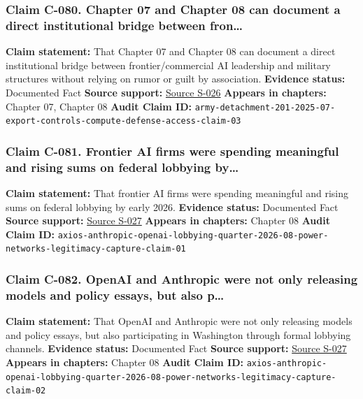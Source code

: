 \documentclass[
  american,
  11pt,
  letterpaper,
]{article}
\begin{document}
\subsubsection{Claim C-080. Chapter 07 and Chapter 08 can document a
direct institutional bridge between
fron\ldots{}}\label{claim-c-080-chapter-07-and-chapter-08-can-document-a-direct-institutional-bridge-between-fron}

\textbf{Claim statement:} That Chapter 07 and Chapter 08 can document a
direct institutional bridge between frontier/commercial AI leadership
and military structures without relying on rumor or guilt by
association. \textbf{Evidence status:} Documented Fact \textbf{Source
support:}
\hyperref[source-s-026-army-launches-detachment-201-executive-innovation-corps-to-drive-tech-transformation]{Source
S-026} \textbf{Appears in chapters:} Chapter 07, Chapter 08
\textbf{Audit Claim ID:}
\texttt{army-detachment-201-2025-07-export-controls-compute-defense-access-claim-03}

\subsubsection{Claim C-081. Frontier AI firms were spending meaningful
and rising sums on federal lobbying
by\ldots{}}\label{claim-c-081-frontier-ai-firms-were-spending-meaningful-and-rising-sums-on-federal-lobbying-by}

\textbf{Claim statement:} That frontier AI firms were spending
meaningful and rising sums on federal lobbying by early 2026.
\textbf{Evidence status:} Documented Fact \textbf{Source support:}
\hyperref[source-s-027-anthropic-outspends-openai-in-biggest-ever-lobbying-quarter]{Source
S-027} \textbf{Appears in chapters:} Chapter 08 \textbf{Audit Claim ID:}
\texttt{axios-anthropic-openai-lobbying-quarter-2026-08-power-networks-legitimacy-capture-claim-01}

\subsubsection{Claim C-082. OpenAI and Anthropic were not only releasing
models and policy essays, but also
p\ldots{}}\label{claim-c-082-openai-and-anthropic-were-not-only-releasing-models-and-policy-essays-but-also-p}

\textbf{Claim statement:} That OpenAI and Anthropic were not only
releasing models and policy essays, but also participating in Washington
through formal lobbying channels. \textbf{Evidence status:} Documented
Fact \textbf{Source support:}
\hyperref[source-s-027-anthropic-outspends-openai-in-biggest-ever-lobbying-quarter]{Source
S-027} \textbf{Appears in chapters:} Chapter 08 \textbf{Audit Claim ID:}
\texttt{axios-anthropic-openai-lobbying-quarter-2026-08-power-networks-legitimacy-capture-claim-02}
\end{document}
